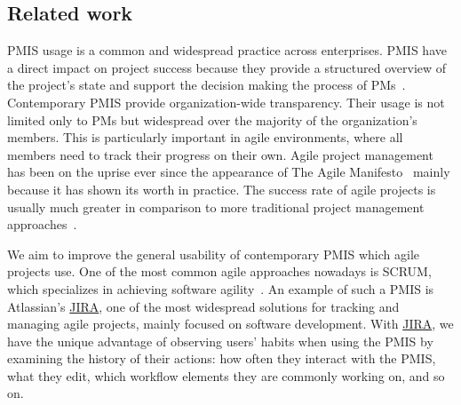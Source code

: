 \documentclass[a4paper, 12pt]{article}
\begin{document}


\subsection{Related work}


PMIS usage is a common and widespread practice across enterprises.  PMIS have a direct impact on project success because they provide a structured overview of the project’s state and support the decision making the process of PMs~\cite{RAYMOND2008213}. Contemporary PMIS provide organization-wide transparency. Their usage is not limited only to PMs but widespread over the majority of the organization’s members. This is particularly important in agile environments, where all members need to track their progress on their own. Agile project management has been on the uprise ever since the appearance of The Agile Manifesto~\cite{alliance2001agile} mainly because it has shown its worth in practice. The success rate of agile projects is usually much greater in comparison to more traditional project management approaches~\cite{SERRADOR20151040}.

We aim to improve the general usability of contemporary PMIS which agile projects use. One of the most common agile approaches nowadays is SCRUM, which specializes in achieving software agility~\cite{sutherland2013scrum}. An example of such a PMIS is Atlassian’s \href{https://www.atlassian.com/software/jira}{JIRA}, one of the most widespread solutions for tracking and managing agile projects, mainly focused on software development. With \href{https://www.atlassian.com/software/jira}{JIRA}, we have the unique advantage of observing users’ habits when using the PMIS by examining the history of their actions: how often they interact with the PMIS, what they edit, which workflow elements they are commonly working on, and so on. 
\end{document}
